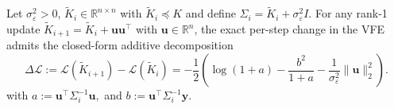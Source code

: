 \documentclass[onefignum,onetabnum]{siamart250211}
\newcommand{\R}{\mathbb{R}}
\begin{document}
\begin{theorem}
\label{thm:per-pivot-gain}
Let $\sigma_\varepsilon^2>0$, $\widetilde{K}_i \in \R^{n\times n}$ with $\widetilde{K}_i\preceq K$ and define $\Sigma_i = \widetilde{K}_i + \sigma_\varepsilon^2I$.
For any rank-1 update $\widetilde K_{i+1}=\widetilde K_i+\bm{u} \bm{u}^\top$ with $\bm{u}\in\R^n$, the exact per-step change in the VFE admits the closed-form additive decomposition 
\begin{equation}
    \Delta \mathcal L
    :=
    \mathcal L(\widetilde K_{i+1})-\mathcal L(\widetilde K_i)
    =
    -\frac{1}{2}\left(
    \log(1+a)
    -\frac{b^2}{1+a}
    -\frac{1}{\sigma_\varepsilon^2}\|\bm{u}\|_2^2
    \right).
    \label{eq:deltaVFE}
\end{equation}
with $a := \bm{u}^\top \Sigma_i^{-1} \bm{u},$ and $b := \bm{u}^\top \Sigma_i^{-1} \bm y.$
\end{theorem}
\end{document}
